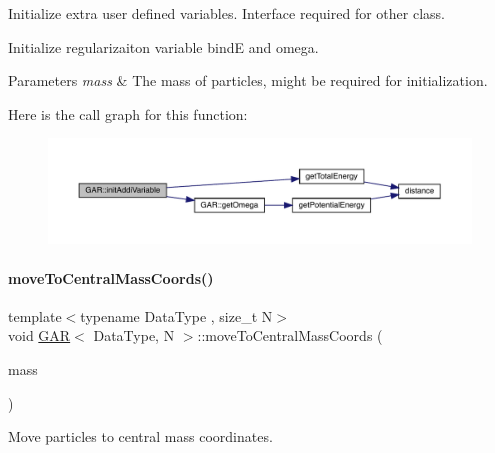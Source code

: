 Initialize extra user defined variables. Interface required for other class. 

Initialize regularizaiton variable bindE and omega. 
\begin{DoxyParams}{Parameters}
{\em mass} & The mass of particles, might be required for initialization. \\
\hline
\end{DoxyParams}
Here is the call graph for this function\+:\nopagebreak
\begin{figure}[H]
\begin{center}
\leavevmode
\includegraphics[width=350pt]{class_g_a_r_a31b5ad2527cc52d1422fa11e2d93fbc6_cgraph}
\end{center}
\end{figure}
\mbox{\label{class_g_a_r_a373d938047a04b051683ee93198b1832}} 
\paragraph{\texorpdfstring{move\+To\+Central\+Mass\+Coords()}{moveToCentralMassCoords()}}
{\footnotesize\ttfamily template$<$typename Data\+Type , size\+\_\+t N$>$ \\
void \mbox{\hyperlink{class_g_a_r}{G\+AR}}$<$ Data\+Type, N $>$\+::move\+To\+Central\+Mass\+Coords (\begin{DoxyParamCaption}\item[{\mbox{\hyperlink{class_g_a_r_a0b446684ae922457a3bf86c904085d8a}{Scalar\+Array}} \&}]{mass }\end{DoxyParamCaption})\hspace{0.3cm}{\ttfamily [inline]}}



Move particles to central mass coordinates. 

